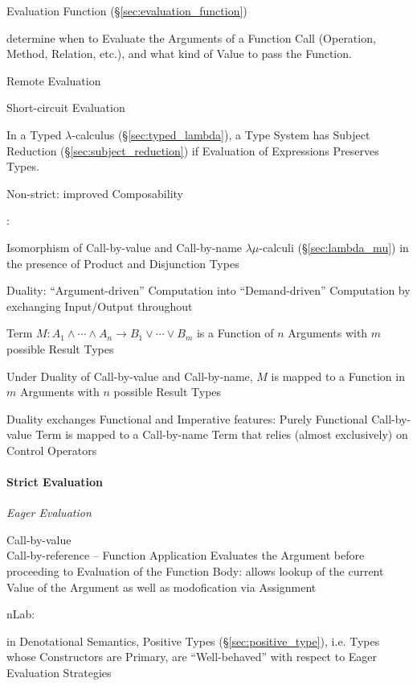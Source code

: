 Evaluation Function (\S\ref{sec:evaluation_function})

determine when to Evaluate the Arguments of a Function Call
(Operation, Method, Relation, etc.), and what kind of Value to pass
the Function.

Remote Evaluation

Short-circuit Evaluation

In a Typed $\lambda$-calculus (\S\ref{sec:typed_lambda}), a Type
System has Subject Reduction (\S\ref{sec:subject_reduction}) if
Evaluation of Expressions Preserves Types.

Non-strict: improved Composability %


\asterism


\cite{selinger01}:

Isomorphism of Call-by-value and Call-by-name $\lambda\mu$-calculi
(\S\ref{sec:lambda_mu}) in the presence of Product and Disjunction
Types

Duality: ``Argument-driven'' Computation into ``Demand-driven''
Computation by exchanging Input/Output throughout

Term $M : A_1 \wedge \cdots \wedge A_n \rightarrow B_1 \vee \cdots
\vee B_m$ is a Function of $n$ Arguments with $m$ possible Result
Types

Under Duality of Call-by-value and Call-by-name, $M$ is mapped to a
Function in $m$ Arguments with $n$ possible Result Types

Duality exchanges Functional and Imperative features: Purely
Functional Call-by-value Term is mapped to a Call-by-name Term that
relies (almost exclusively) on Control Operators %



\paragraph{Strict Evaluation}\label{sec:strict_evaluation}\hfill

\emph{Eager Evaluation}

Call-by-value \\
Call-by-reference -- Function Application Evaluates the Argument
before proceeding to Evaluation of the Function Body: allows lookup of
the current Value of the Argument as well as modofication via
Assignment

nLab:

in Denotational Semantics, Positive Types (\S\ref{sec:positive_type}),
i.e. Types whose Constructors are Primary, are ``Well-behaved'' with
respect to Eager Evaluation Strategies




